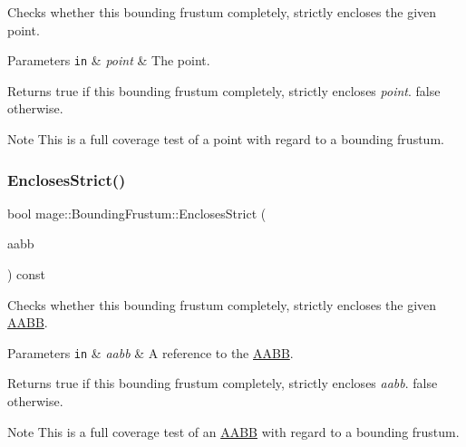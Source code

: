 Checks whether this bounding frustum completely, strictly encloses the given point.


\begin{DoxyParams}[1]{Parameters}
\mbox{\tt in}  & {\em point} & The point. \\
\hline
\end{DoxyParams}
\begin{DoxyReturn}{Returns}
{\ttfamily true} if this bounding frustum completely, strictly encloses {\itshape point}. {\ttfamily false} otherwise. 
\end{DoxyReturn}
\begin{DoxyNote}{Note}
This is a full coverage test of a point with regard to a bounding frustum. 
\end{DoxyNote}
\hypertarget{classmage_1_1_bounding_frustum_aacdbcc48558489bec9ad87d52104626d}{}\label{classmage_1_1_bounding_frustum_aacdbcc48558489bec9ad87d52104626d} 
\subsubsection{\texorpdfstring{Encloses\+Strict()}{EnclosesStrict()}\hspace{0.1cm}{\footnotesize\ttfamily [3/4]}}
{\footnotesize\ttfamily bool mage\+::\+Bounding\+Frustum\+::\+Encloses\+Strict (\begin{DoxyParamCaption}\item[{const \hyperlink{classmage_1_1_a_a_b_b}{A\+A\+BB} \&}]{aabb }\end{DoxyParamCaption}) const\hspace{0.3cm}{\ttfamily [noexcept]}}

Checks whether this bounding frustum completely, strictly encloses the given \hyperlink{classmage_1_1_a_a_b_b}{A\+A\+BB}.


\begin{DoxyParams}[1]{Parameters}
\mbox{\tt in}  & {\em aabb} & A reference to the \hyperlink{classmage_1_1_a_a_b_b}{A\+A\+BB}. \\
\hline
\end{DoxyParams}
\begin{DoxyReturn}{Returns}
{\ttfamily true} if this bounding frustum completely, strictly encloses {\itshape aabb}. {\ttfamily false} otherwise. 
\end{DoxyReturn}
\begin{DoxyNote}{Note}
This is a full coverage test of an \hyperlink{classmage_1_1_a_a_b_b}{A\+A\+BB} with regard to a bounding frustum. 
\end{DoxyNote}
\hypertarget{classmage_1_1_bounding_frustum_ae3dce877ac0e87dd6b9f7f8644c8bcfc}{}\label{classmage_1_1_bounding_frustum_ae3dce877ac0e87dd6b9f7f8644c8bcfc} 
